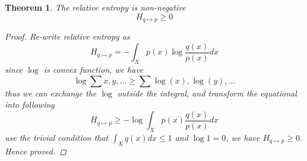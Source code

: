 \documentclass[a4paper]{article}
\newtheorem{theorem}{Theorem}[section]
\begin{document}
\begin{theorem}
    The relative entropy is non-negative
    \begin{equation}
        H_{q \mapsto p} \geqslant 0
    \end{equation}

    \begin{proof}
        Re-write relative entropy as
        \begin{equation*}
            H_{q \mapsto p} = - \int_{X} p(x) \log{\frac{q(x)}{p(x)}} dx
        \end{equation*}
        since $\log{}$ is convex function, we have
        \begin{equation*}
            \log{\sum{x, y, \dots}} \geqslant \sum{\log(x), \log(y), \dots}
        \end{equation*}
        thus we can exchange the $\log{}$ outside the integral, and transform the equational into following
        \begin{equation*}
            H_{q \mapsto p} \geqslant - \log{\int_{X} p(x) \frac{q(x)}{p(x)} dx}
        \end{equation*}
        use the trivial condition that $\int_{X} q(x) dx \leqslant 1$ and $\log{1} = 0$, we have $H_{q \mapsto p} \geqslant 0$.
        Hence proved.
    \end{proof}
\end{theorem}
\end{document}
